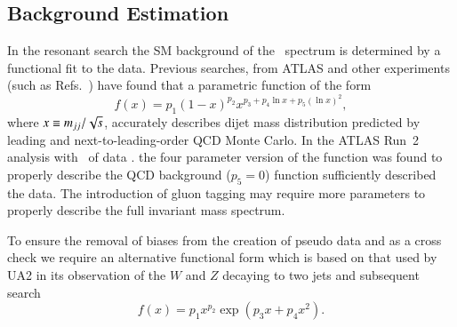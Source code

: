 \subsection{Background Estimation}

In the resonant search the SM background of the \mjj\ spectrum is determined by a functional fit to the data.
Previous searches, from ATLAS and other experiments (such as Refs.~\cite{Bagnaia:1984ip,PhysRevD.79.112002,EXOT-2010-01,CMS-EXO-10-010,EXOT-2010-07,EXOT-2013-11})
have found that a parametric function of the form
\begin{equation}
  f(x) = p_1 (1 - x)^{p_2} x^{p_3 + p_4\ln x + p_5 (\ln x)^2},
\label{Eq:fitfunction}
\end{equation}
where $x \equiv m_{jj} /\sqrt{s}$, accurately describes dijet mass distribution predicted by leading and next-to-leading-order 
QCD Monte Carlo. In the ATLAS Run~2 analysis with \integLumi\ of data  \cite{EXOT-2019-03,Nishu:2646455}. the four parameter 
version of the function was found to properly describe the QCD background ($p_5 = 0$) function sufficiently described the data.  
The introduction of  gluon tagging may require more  parameters to properly describe the full invariant mass spectrum.

To ensure the removal of biases from the creation of pseudo data and as a cross check we require an alternative functional 
form which is based on that used by UA2 \cite{Alitti:1990kw, Alitti:1993pn} in its observation of the $W$ and $Z$ decaying 
to two jets and subsequent search
\begin{equation}
  f(x) = p_1 x^{p_2} \exp\left({p_3 x + p_4  x^2 }\right).
\label{Eq:fitfunction2}
\end{equation}
